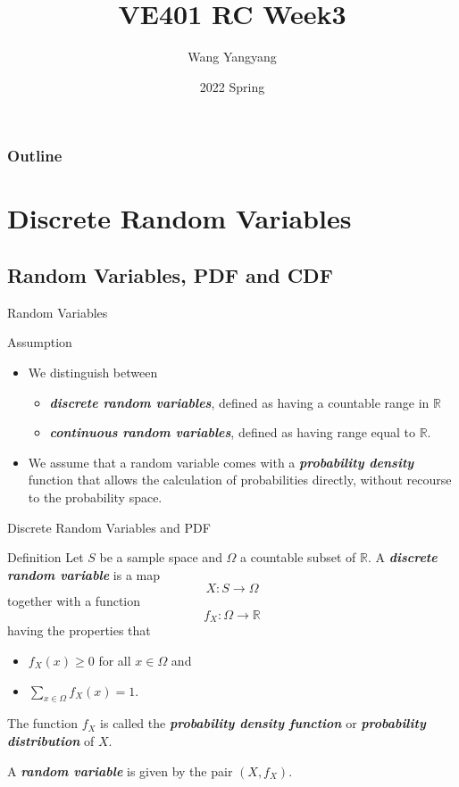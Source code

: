 \documentclass{beamer}
\title{VE401 RC Week3}
\author{Wang Yangyang}
\date{2022 Spring}
\institute{UM-SJTU JI}
\newcommand{\bb}[1]{\textcolor{antiquefuchsia}{\textbf{\textit{#1}}}}
\begin{document}
\maketitle

\begin{frame}
\frametitle{Outline}
\tableofcontents
\end{frame}




\section{Discrete Random Variables}
\subsection{Random Variables, PDF and CDF}
\begin{frame}{Random Variables}
\begin{block}{Assumption}
\begin{itemize}
\item We distinguish between 
\begin{itemize}
\item \bb{discrete random variables}, defined as having a countable range in $\mathbb{R}$
\item \bb{continuous random variables}, defined as having range equal to $\mathbb{R}$.
\end{itemize}
\item We assume that a random variable comes with a \bb{probability density} function that allows the calculation of probabilities directly, without recourse to the probability space.
\end{itemize}
\end{block}
\end{frame}

\begin{frame}{Discrete Random Variables and PDF}
\begin{block}{Definition}
Let $S$ be a sample space and $\Omega$ a countable subset of $\mathbb{R}$. A 
\bb{discrete random variable} is a map
$$
X: S \rightarrow \Omega
$$
together with a function
$$
f_{X}: \Omega \rightarrow \mathbb{R}
$$
having the properties that
\begin{itemize}
\item $f_{X}(x) \geq 0$ for all $x \in \Omega$ and
\item $\sum_{x \in \Omega} f_{X}(x)=1$.
\end{itemize}

\end{block}
The function $f_{X}$ is called the \bb{probability density function} or \bb{probability distribution} of $X$.

A \bb{random variable} is given by the pair $\left(X, f_{X}\right)$.
\end{frame}
\end{document}
